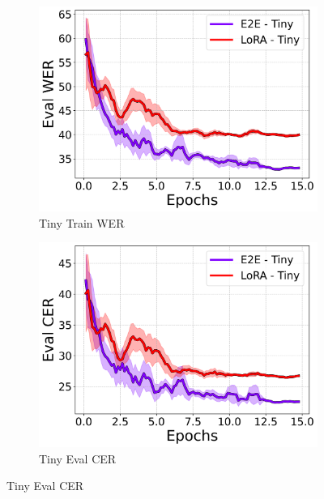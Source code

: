 \documentclass[10pt,twocolumn,letterpaper]{article}
\begin{document}
\begin{figure}[t]
    \begin{subfigure}[b]{0.24\textwidth}
        \centering
        \includegraphics[width=\textwidth]{./tiny/eval_wer_line.png}
        \caption{Tiny Train WER}
    \end{subfigure}
    \begin{subfigure}[b]{0.24\textwidth}
        \centering
        \includegraphics[width=\textwidth]{./tiny/eval_cer_line.png}
        \caption{Tiny Eval CER}
    \end{subfigure}
    

\end{figure}
\end{document}
